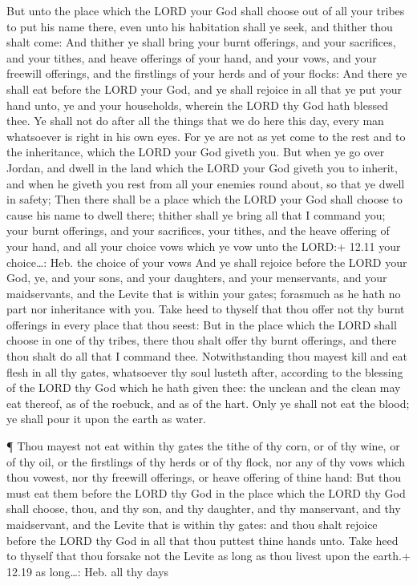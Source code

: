  But unto the place which the LORD your God shall choose out
of all your tribes to put his name there, even unto his habitation shall
ye seek, and thither thou shalt come:  And thither ye shall
bring your burnt offerings, and your sacrifices, and your tithes, and
heave offerings of your hand, and your vows, and your freewill
offerings, and the firstlings of your herds and of your flocks:
 And there ye shall eat before the LORD your God, and ye
shall rejoice in all that ye put your hand unto, ye and your households,
wherein the LORD thy God hath blessed thee.  Ye shall not do
after all the things that we do here this day, every man whatsoever is
right in his own eyes.  For ye are not as yet come to the
rest and to the inheritance, which the LORD your God giveth you.
 But when ye go over Jordan, and dwell in the land which
the LORD your God giveth you to inherit, and when he giveth you rest
from all your enemies round about, so that ye dwell in safety;
 Then there shall be a place which the LORD your God shall
choose to cause his name to dwell there; thither shall ye bring all that
I command you; your burnt offerings, and your sacrifices, your tithes,
and the heave offering of your hand, and all your choice vows which ye
vow unto the LORD:+ 12.11 your choice\ldots: Heb. the choice of your
vows  And ye shall rejoice before the LORD your God, ye,
and your sons, and your daughters, and your menservants, and your
maidservants, and the Levite that is within your gates; forasmuch as he
hath no part nor inheritance with you.  Take heed to
thyself that thou offer not thy burnt offerings in every place that thou
seest:  But in the place which the LORD shall choose in one
of thy tribes, there thou shalt offer thy burnt offerings, and there
thou shalt do all that I command thee.  Notwithstanding
thou mayest kill and eat flesh in all thy gates, whatsoever thy soul
lusteth after, according to the blessing of the LORD thy God which he
hath given thee: the unclean and the clean may eat thereof, as of the
roebuck, and as of the hart.  Only ye shall not eat the
blood; ye shall pour it upon the earth as water.

 ¶ Thou mayest not eat within thy gates the tithe of thy
corn, or of thy wine, or of thy oil, or the firstlings of thy herds or
of thy flock, nor any of thy vows which thou vowest, nor thy freewill
offerings, or heave offering of thine hand:  But thou must
eat them before the LORD thy God in the place which the LORD thy God
shall choose, thou, and thy son, and thy daughter, and thy manservant,
and thy maidservant, and the Levite that is within thy gates: and thou
shalt rejoice before the LORD thy God in all that thou puttest thine
hands unto.  Take heed to thyself that thou forsake not the
Levite as long as thou livest upon the earth.+ 12.19 as long\ldots: Heb.
all thy days

